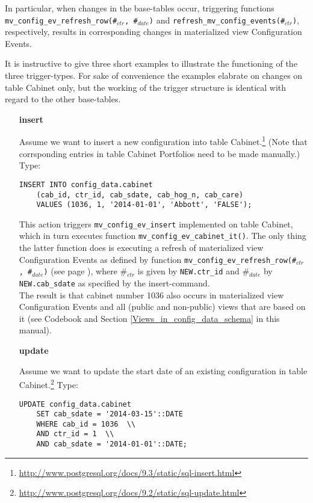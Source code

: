 In particular, when changes in the base-tables occur, triggering functions \texttt{\footnotesize mv\_config\_ev\_refresh\_row(\#$_{ctr}$, \#$_{date}$)} and \texttt{\footnotesize refresh\_mv\_config\_events(\#$_{ctr}$)}, respectively, results in corresponding changes in materialized view Configuration Events.

It is instructive to give three short examples to illustrate the functioning of the three trigger-types. For sake of convenience the examples elabrate on changes on table Cabinet only, but the working of the trigger structure is identical with regard to the other base-tables.
\begin{itemize}
\item[{\bf insert}]{%
Assume we want to insert a new configuration into table Cabinet.\footnote{\url{http://www.postgresql.org/docs/9.3/static/sql-insert.html}}
(Note that corrsponding entries in table Cabinet Portfolios need to be made manually.) 
Type:
\begin{lstlisting}[language=postgreSQL]
INSERT INTO config_data.cabinet
	(cab_id, ctr_id, cab_sdate, cab_hog_n, cab_care)
	VALUES (1036, 1, '2014-01-01', 'Abbott', 'FALSE');
\end{lstlisting}
This action triggers \texttt{\footnotesize mv\_config\_ev\_insert} implemented on table Cabinet, which in turn executes function \texttt{\footnotesize mv\_config\_ev\_cabinet\_it()}. The only thing the latter function does is executing a refresh of materialized view Configuration Events as defined by function \texttt{\footnotesize mv\_config\_ev\_refresh\_row(\#$_{ctr}$, \#$_{date}$)} (see page \pageref{function_mv_config_ev_refresh}), where \#$_{ctr}$ is given by \texttt{\footnotesize NEW.ctr\_id} and \#$_{date}$ by \texttt{\footnotesize NEW.cab\_sdate} as specified by the insert-command.\\
The result is that cabinet number 1036 also occurs in  materialized view Configuration Events and all (public and non-public) views that are based on it (see Codebook and Section \ref{Views_in_config_data_schema} in this manual).%
}

\item[{\bf update}]{%
Assume we want to update the start date of an existing configuration in table Cabinet.\footnote{\url{http://www.postgresql.org/docs/9.2/static/sql-update.html}}
Type:
\begin{lstlisting}[language=postgreSQL]
UPDATE config_data.cabinet 
	SET cab_sdate = '2014-03-15'::DATE 
	WHERE cab_id = 1036  \\
	AND ctr_id = 1  \\
	AND cab_sdate = '2014-01-01'::DATE;
\end{lstlisting}

}
\end{itemize}

